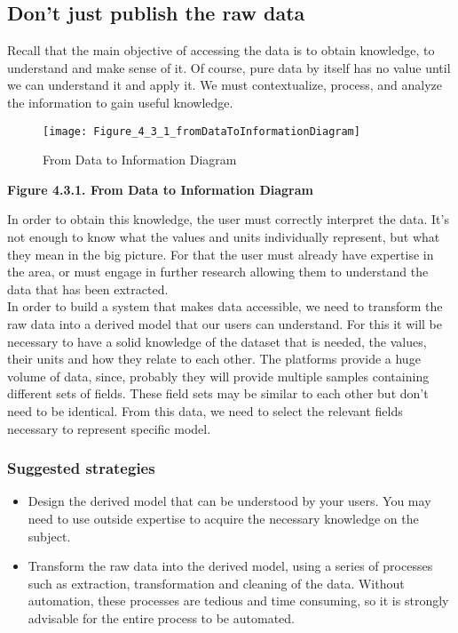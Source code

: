 \subsection{Don't just publish the raw data}

Recall that the main objective of accessing the data is to obtain knowledge, to understand and make sense of it.
Of course, pure data by itself has no value until we can understand it and apply it.
We must contextualize, process, and analyze the information to gain useful knowledge. \\ 
    
\begin{figure}[ht]
    \centering
    \texttt{[image: Figure\_4\_3\_1\_fromDataToInformationDiagram]}
    \caption{From Data to Information Diagram}
 \end{figure}
 
\begin{center}
    \bf{        
    Figure 4.3.1. From Data to Information Diagram}
\end{center}
 
In order to obtain this knowledge, the user must correctly interpret the data.
It's not enough to know what the values and units individually represent, but what they mean in the big picture.
For that the user must already have expertise in the area, or must engage in further research allowing them to understand the data that has been extracted.\\
    
In order to build a system that makes data accessible, we need to transform the raw data into a derived model that our users can understand.
For this it will be necessary to have a solid knowledge of the dataset that is needed, the values, their units and how they relate to each other.
The platforms provide a huge volume of data, since, probably they will provide multiple samples containing different sets of fields. 
These field sets may be similar to each other but don't need to be identical.
From this data, we need to select the relevant fields necessary to represent specific model.\\

\subsubsection*{Suggested strategies} 

\begin{itemize}
    \item Design the derived model that can be understood by your users. You may need to use outside expertise to acquire the necessary knowledge on the subject.

    \item Transform the raw data into the derived model, using a series of processes such as extraction, transformation and cleaning of the data.
        Without automation, these processes are tedious and time consuming, so it is strongly advisable for the entire process to be automated.
\end{itemize}


